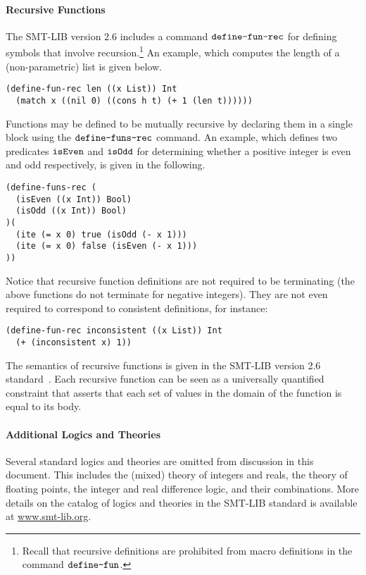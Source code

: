 \documentclass[english,a4paper,10pt]{article}
\begin{document}
\begin{appendix}
\paragraph{Recursive Functions}
The SMT-LIB version 2.6 includes a command $\texttt{define-fun-rec}$
for defining symbols that involve recursion.\footnote{
Recall that recursive definitions are prohibited from macro definitions in the command
$\texttt{define-fun}$.
}
An example, which computes the length of a (non-parametric) list 
is given below.
\begin{lstlisting}
(define-fun-rec len ((x List)) Int 
  (match x ((nil 0) ((cons h t) (+ 1 (len t))))))
\end{lstlisting}
Functions may be defined to be mutually recursive by declaring
them in a single block using the $\texttt{define-funs-rec}$ command.
An example, which defines two predicates ${\tt isEven}$ and ${\tt isOdd}$
for determining whether a positive integer is even and odd respectively,
is given in the following.
\begin{lstlisting}
(define-funs-rec (
  (isEven ((x Int)) Bool)
  (isOdd ((x Int)) Bool)
)(
  (ite (= x 0) true (isOdd (- x 1)))
  (ite (= x 0) false (isEven (- x 1)))
))
\end{lstlisting}
Notice that recursive function definitions are not required to be terminating
(the above functions do not terminate for negative integers).
They are not even required to correspond to consistent definitions, for instance:
\begin{lstlisting}
(define-fun-rec inconsistent ((x List)) Int 
  (+ (inconsistent x) 1))
\end{lstlisting}
The semantics of recursive functions is given in 
the SMT-LIB version 2.6 standard~\cite{BarFT-RR-17}.
Each recursive function can be seen as a universally quantified constraint
that asserts that each set of values in the domain of the function
is equal to its body.


\paragraph{Additional Logics and Theories}
Several standard logics and theories are omitted from discussion in this document.
This includes the (mixed) theory of integers and reals,
the theory of floating points,
the integer and real difference logic,
and their combinations.
More details on the catalog of logics and theories in the SMT-LIB standard
is available at \url{www.smt-lib.org}.

\end{appendix}
\end{document}
